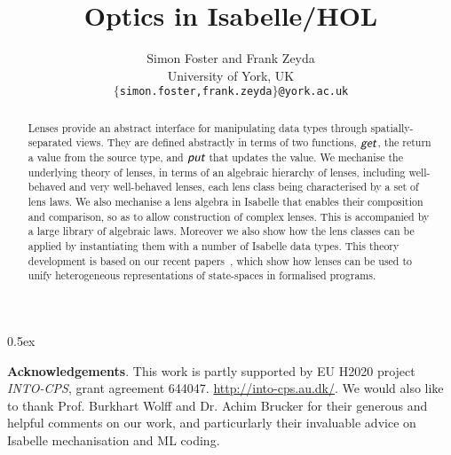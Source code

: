 \documentclass[11pt,a4paper]{article}
\newcommand{\lput}{\textit{\textsf{put}}}
\newcommand{\lget}{\textit{\textsf{get}}}
\begin{document}
\title{Optics in Isabelle/HOL}

\author{Simon Foster and Frank Zeyda \\[.5ex] University of York, UK \\[2ex] \texttt{\small $\{$simon.foster,frank.zeyda$\}$@york.ac.uk}}

\maketitle

\begin{abstract}
  Lenses provide an abstract interface for manipulating data types through spatially-separated views. They are defined
  abstractly in terms of two functions, $\lget$, the return a value from the source type, and $\lput$ that updates
  the value. We mechanise the underlying theory of lenses, in terms of an algebraic hierarchy of lenses, including
  well-behaved and very well-behaved lenses, each lens class being characterised by a set of lens laws. We also mechanise 
  a lens algebra in Isabelle that enables their composition and comparison, so as to allow construction of complex lenses.
  This is accompanied by a large library of algebraic laws. Moreover we also show how the lens classes can be applied by 
  instantiating them with a number of Isabelle data types. This theory development is based on our recent 
  papers~\cite{Foster16a,Foster2020-IsabelleUTP}, which show how lenses can be used to unify heterogeneous representations 
  of state-spaces in formalised programs.
\end{abstract}

\tableofcontents

\parindent 0pt\parskip 0.5ex



\vspace{4ex}

\noindent\textbf{Acknowledgements}. This work is partly supported by EU H2020 project \emph{INTO-CPS}, grant agreement
644047. \url{http://into-cps.au.dk/}. We would also like to thank Prof. Burkhart Wolff and Dr. Achim Brucker
for their generous and helpful comments on our work, and particurlarly their invaluable advice on Isabelle
mechanisation and ML coding.



\end{document}
